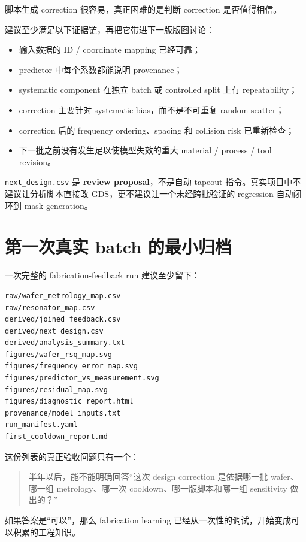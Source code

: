 脚本生成 correction 很容易，真正困难的是判断 correction 是否值得相信。

建议至少满足以下证据链，再把它带进下一版版图讨论：

\begin{itemize}
  \item 输入数据的 ID / coordinate mapping 已经可靠；
  \item predictor 中每个系数都能说明 provenance；
  \item systematic component 在独立 batch 或 controlled split 上有 repeatability；
  \item correction 主要针对 systematic bias，而不是不可重复 random scatter；
  \item correction 后的 frequency ordering、spacing 和 collision risk 已重新检查；
  \item 下一批之前没有发生足以使模型失效的重大 material / process / tool revision。
\end{itemize}

\begin{warningbox}
\texttt{next\_design.csv} 是 \textbf{review proposal}，不是自动 tapeout 指令。真实项目中不建议让分析脚本直接改 GDS，更不建议让一个未经跨批验证的 regression 自动闭环到 mask generation。
\end{warningbox}

\section{第一次真实 batch 的最小归档}

一次完整的 fabrication-feedback run 建议至少留下：

\begin{verbatim}
raw/wafer_metrology_map.csv
raw/resonator_map.csv
derived/joined_feedback.csv
derived/next_design.csv
derived/analysis_summary.txt
figures/wafer_rsq_map.svg
figures/frequency_error_map.svg
figures/predictor_vs_measurement.svg
figures/residual_map.svg
figures/diagnostic_report.html
provenance/model_inputs.txt
run_manifest.yaml
first_cooldown_report.md
\end{verbatim}

这份列表的真正验收问题只有一个：

\begin{quote}
半年以后，能不能明确回答“这次 design correction 是依据哪一批 wafer、哪一组 metrology、哪一次 cooldown、哪一版脚本和哪一组 sensitivity 做出的？”
\end{quote}

如果答案是“可以”，那么 fabrication learning 已经从一次性的调试，开始变成可以积累的工程知识。

